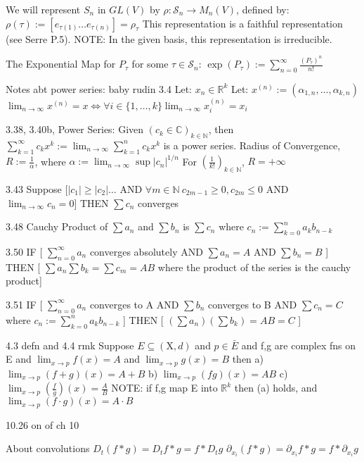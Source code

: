 \documentclass{article}
\theoremstyle{definition}
\begin{document}
We will represent $S_n$ in $GL(V)$ by $\rho : \mathcal{S}_n \rightarrow M_n(V)$, defined by: \( \rho(\tau) := [ e_{\tau(1)} \dots e_{\tau(n)} ]= \rho_{\tau} \)
This representation is a faithful representation (see Serre P.5).
NOTE: In the given basis, this representation is irreducible. 

The Exponential Map for $  P_\tau $ for some $\tau \in \mathcal{S}_n $:
$ \exp(P_\tau ) := \sum_{n=0}^\infty \frac{ (P_\tau)^n}{n!} $

Notes abt power series:
baby rudin
3.4 
Let: $ x_n \in \mathbb{R}^k $
Let: $x^{(n)} := (\alpha_{1,n}, \dots, \alpha_{k,n})$
$ \lim_{n\rightarrow \infty}x^{(n)} = x \iff \forall i \in \{1,\dots,k\} \lim_{n\rightarrow \infty} x_i^{(n)} = x_i $

3.38, 3.40b,
Power Series: Given $(c_k \in \mathbb{C})_{k\in\mathbb{N}}$, then $ \sum_{k=1}^\infty c_k x^k := \lim_{n \rightarrow \infty} \sum_{k=1}^n c_k x^k $ is a power series.
Radius of Convergence, $R:= \frac{1}{\alpha}$, where $\alpha := \lim_{n \rightarrow \infty} \sup |c_n|^{1/n} $
For $(\frac{1}{k!})_{k\in\mathbb{N}} $, $R=+\infty$

3.43
Suppose [$ |c_1|\geq |c_2| \dots $ AND $\forall m \in \mathbb{N} \: c_{2m-1} \geq 0, c_{2m} \leq 0 $ AND $\lim_{n\rightarrow \infty} c_n = 0$] THEN $\sum c_n$ converges

3.48
Cauchy Product of $\sum a_n$ and $\sum b_n$ is $ \sum c_n $ where $ c_n :=\sum_{k=0}^n a_k b_{n-k}$

3.50
IF [ $\sum_{n=0}^\infty a_n $ converges absolutely AND $\sum a_n = A$ AND $\sum b_n = B$ ] THEN [ $\sum a_n \sum b_k = \sum c_m = AB$ where the product of the series is the cauchy product]

3.51
IF [ $\sum_{n=0}^\infty a_n $ converges to A  AND $\sum b_n $ converges to B AND $\sum c_n = C$ where $ c_n :=\sum_{k=0}^n a_k b_{n-k}$ ] THEN [ $(\sum a_n)( \sum b_k) = AB = C$ ]

4.3 defn and 4.4 rmk
Suppose $E \subseteq (\mathrm{X}, d)$ and $p \in \bar{E} $ and f,g are complex fns on E and $\lim_{x\rightarrow p} f(x) = A$ and $\lim_{x\rightarrow p} g(x) = B$
then 
a) $\lim_{x\rightarrow p} (f+g)(x) = A+B$ 
b)  $\lim_{x\rightarrow p} (fg)(x) = AB$
c)  $\lim_{x\rightarrow p} (\frac{f}{g})(x) = \frac{A}{B}$
NOTE: if f,g map E into $\mathbb{R}^k$ then (a) holds, and $\lim_{x\rightarrow p} (f\cdot g)(x) = A \cdot B $

 10.26 on of ch 10


About convolutions
$D_t(f*g) = D_t f * g = f * D_t g $ 
$\partial_{x_i}(f*g) = \partial_{x_i}f * g = f* \partial_{x_i}g $
\end{document}
